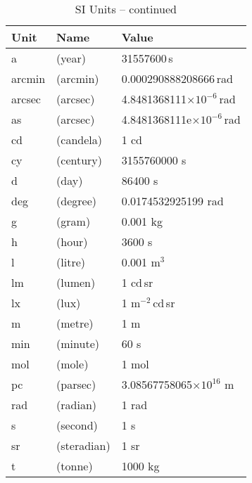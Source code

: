 \begin{table}
\addtocounter{table}{-1}
\caption{SI Units -- continued}

\begin{center}
\begin{tabular}{lll}
Unit & Name & Value\\
\hline
      a        &   (year)                  &     31557600\,s\\
      arcmin   &   (arcmin)                &     0.000290888208666\,rad\\
      arcsec   &   (arcsec)                &     4.8481368111$\times10^{-6}$\,rad\\
      as       &   (arcsec)                &     4.8481368111e$\times10^{-6}$\,rad\\
      cd       &   (candela)               &     1 cd\\
      cy       &   (century)               &     3155760000 s\\
      d        &   (day)                   &     86400 s\\
      deg      &   (degree)                &     0.0174532925199 rad\\
      g        &   (gram)                  &     0.001 kg\\
      h        &   (hour)                  &     3600 s\\
      l        &   (litre)                 &     0.001 m$^{3}$\\
      lm       &   (lumen)                 &     1 cd\,sr\\
      lx       &   (lux)                   &     1 m$^{-2}$\,cd\,sr\\
      m        &   (metre)                 &     1 m\\
      min      &   (minute)                &     60 s\\
      mol      &   (mole)                  &     1 mol\\
      pc       &   (parsec)                &     3.08567758065$\times10^{16}$ m\\
      rad      &   (radian)                &     1 rad\\
      s        &   (second)                &     1 s\\
      sr       &   (steradian)             &     1 sr\\
      t        &   (tonne)                 &     1000 kg\\

\end{tabular}
\end{center}
\end{table}



